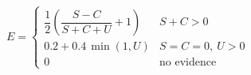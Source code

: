 \documentclass[border=3pt,varwidth=16cm]{standalone}
\begin{document}
$\displaystyle E = \begin{cases} \dfrac{1}{2}\left(\dfrac{S - C}{S + C + U} + 1\right) & S + C > 0 \\ 0.2 + 0.4\,\min(1, U) & S = C = 0,\ U > 0 \\ 0 & \text{no evidence} \end{cases}$
\end{document}
